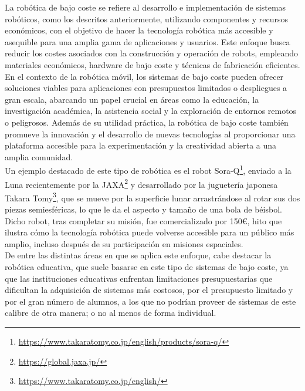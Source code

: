 La robótica de bajo coste se refiere al desarrollo e implementación de sistemas
robóticos, como los descritos anteriormente, utilizando componentes y recursos
económicos, con el objetivo de hacer la tecnología robótica más accesible y
asequible para una amplia gama de aplicaciones y usuarios.
Este enfoque busca reducir los costes asociados con la construcción y operación
de robots, empleando materiales económicos, hardware de bajo coste y técnicas
de fabricación eficientes.
\\

En el contexto de la robótica móvil, los sistemas de bajo coste pueden ofrecer
soluciones viables para aplicaciones con presupuestos limitados o despliegues a
gran escala, abarcando un papel crucial en áreas como la educación, la
investigación académica, la asistencia social y la exploración de entornos
remotos o peligrosos.
Además de su utilidad práctica, la robótica de bajo coste también promueve la
innovación y el desarrollo de nuevas tecnologías al proporcionar una plataforma
accesible para la experimentación y la creatividad abierta a una amplia
comunidad.
\\

Un ejemplo destacado de este tipo de robótica es el robot Sora-Q\footnote{
\href{https://www.takaratomy.co.jp/english/products/sora-q/}{https://www.takaratomy.co.jp/english/products/sora-q/}},
enviado a la Luna recientemente por la JAXA\footnote{
\href{https://global.jaxa.jp/}{https://global.jaxa.jp/}} y desarrollado por la
juguetería japonesa Takara Tomy\footnote{
\href{https://www.takaratomy.co.jp/english/}{https://www.takaratomy.co.jp/english/}},
que se mueve por la superficie lunar arrastrándose al rotar sus dos piezas
semiesféricas, lo que le da el aspecto y tamaño de una bola de béisbol.
Dicho robot, tras completar su misión, fue comercializado por 150\euro, hito que
ilustra cómo la tecnología robótica puede volverse accesible para un público más
amplio, incluso después de su participación en misiones espaciales.
\\

De entre las distintas áreas en que se aplica este enfoque, cabe destacar la
robótica educativa, que suele basarse en este tipo de sistemas de bajo coste, ya
que las instituciones educativas enfrentan limitaciones presupuestarias que
dificultan la adquisición de sistemas más costosos, por el presupuesto limitado
y por el gran número de alumnos, a los que no podrían proveer de sistemas de
este calibre de otra manera; o no al menos de forma individual.
\\

